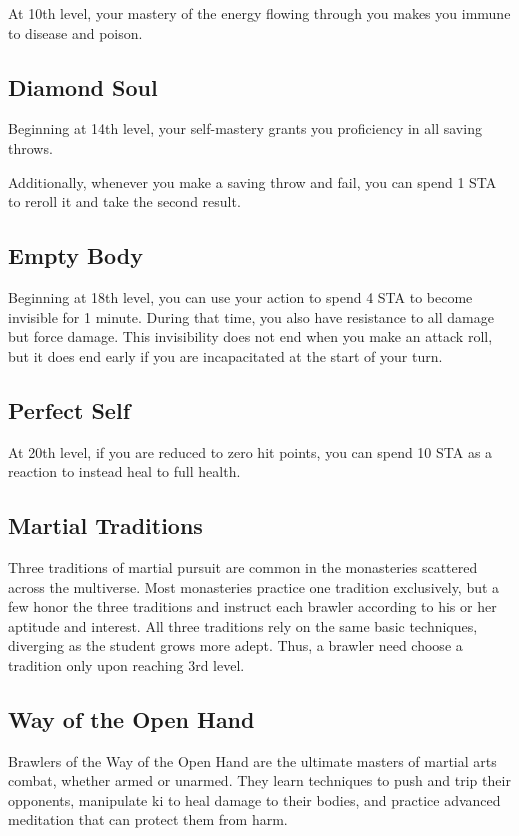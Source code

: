At 10th level, your mastery of the energy flowing through you makes you immune to disease and poison.

\subsection{Diamond Soul}

Beginning at 14th level, your self-mastery grants you proficiency in all saving throws.

Additionally, whenever you make a saving throw and fail, you can spend 1 STA to reroll it and take the second result.

\subsection{Empty Body}

Beginning at 18th level, you can use your action to spend 4 STA to become invisible for 1 minute. During that time, you also have resistance to all damage but force damage. This invisibility does not end when you make an attack roll, but it does end early if you are incapacitated at the start of your turn.

\subsection{Perfect Self}

At 20th level, if you are reduced to zero hit points, you can spend 10 STA as a reaction to instead heal to full health.

\subsection{Martial Traditions}

Three traditions of martial pursuit are common in the monasteries scattered across the multiverse. Most monasteries practice one tradition exclusively, but a few honor the three traditions and instruct each brawler according to his or her aptitude and interest. All three traditions rely on the same basic techniques, diverging as the student grows more adept. Thus, a brawler need choose a tradition only upon reaching 3rd level.

\subsection{Way of the Open Hand}

Brawlers of the Way of the Open Hand are the ultimate masters of martial arts combat, whether armed or unarmed. They learn techniques to push and trip their opponents, manipulate ki to heal damage to their bodies, and practice advanced meditation that can protect them from harm.

